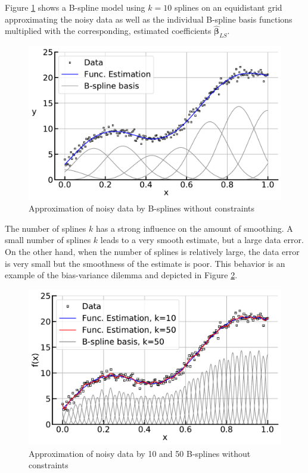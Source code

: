 \documentclass[10pt,a4paper]{article}
\begin{document}
	
	Figure \ref{fig:smooth_bf} shows a B-spline model using $k=10$ splines on an equidistant grid approximating the noisy data as well as the individual B-spline basis functions multiplied with the corresponding, estimated coefficients $\boldsymbol{\hat \beta}_{LS}$.
	
	\begin{figure}[H]
		\centering
		\includegraphics[width=\columnwidth]{../thesisplots/smooth_bf.pdf}
		\caption{Approximation of noisy data by B-splines without constraints}
		\label{fig:smooth_bf}
    \end{figure}
	
	
	The number of splines $k$ has a strong influence on the amount of smoothing. A small number of splines $k$ leads to a very smooth estimate, but a large data error. On the other hand, when the number of splines is relatively large, the data error is very small but the smoothness of the estimate is poor. This behavior is an example of the bias-variance dilemma and depicted in Figure \ref{fig:smooth_bf_large}. \cite{sammut2011}


	\begin{figure}[H]
	\centering
	\includegraphics[width=\linewidth]{../thesisplots/smooth_wiggly_bf.pdf}
	\caption{Approximation of noisy data by 10 and 50 B-splines without constraints}
	\label{fig:smooth_bf_large}
	\end{figure}
\end{document}
